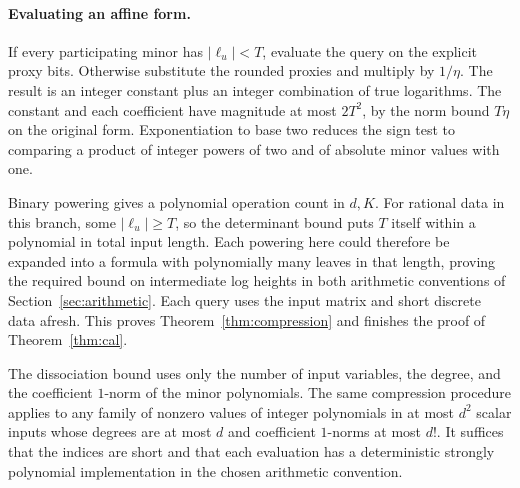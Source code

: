 \paragraph{Evaluating an affine form.}
If every participating minor has \(|\ell_u|<T\), evaluate the query
on the explicit proxy bits. Otherwise substitute the rounded proxies
and multiply by \(1/\eta\). The result is an integer constant plus
an integer combination of true logarithms. The constant and each
coefficient have magnitude at most \(2T^2\), by the norm bound
\(T\eta\) on the original form. Exponentiation to base two reduces
the sign test to comparing a product of integer powers of two and
of absolute minor values with one.

Binary powering gives a polynomial operation count in \(d,K\).
For rational data in this branch, some \(|\ell_u|\ge T\), so the
determinant bound puts \(T\) itself within a polynomial in total
input length. Each powering here could therefore be expanded into a
formula with polynomially many leaves in that length, proving the
required bound on intermediate log heights in both arithmetic
conventions of Section~\ref{sec:arithmetic}. Each query uses the
input matrix and short discrete data afresh. This proves
Theorem~\ref{thm:compression} and finishes the proof of
Theorem~\ref{thm:cal}.

\begin{remark}
The dissociation bound uses only the number of input variables, the
degree, and the coefficient \(1\)-norm of the minor polynomials.
The same compression procedure applies to any family of nonzero
values of integer polynomials in at most \(d^2\) scalar inputs whose
degrees are at most \(d\) and coefficient \(1\)-norms at most \(d!\).
It suffices that the indices are short and that each evaluation has
a deterministic strongly polynomial implementation in the chosen
arithmetic convention.
\end{remark}
